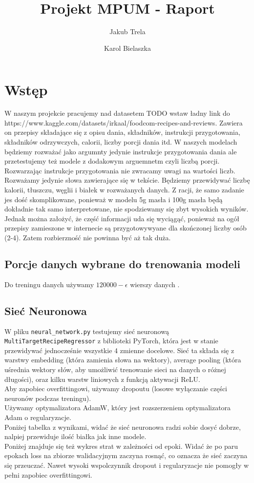 \documentclass[12pt,a4paper]{article}
\title{Projekt MPUM - Raport}
\author{Jakub Trela \and Karol Bielaszka}
\date{}
\begin{document}
\maketitle

\section*{Wstęp}
W naszym projekcie pracujemy nad datasetem {TODO wstaw ładny link do https://www.kaggle.com/datasets/irkaal/foodcom-recipes-and-reviews}. Zawiera on przepisy składające się z opisu dania, składników, instrukcji przygotowania, składników odrzywczych, calorii, liczby porcji dania itd. W naszych modelach będziemy rozważać jako argumnty jedynie instrukcje przygotowania dania ale przetestujemy też modele z dodakowym arguemnetm czyli liczbą porcji. Rozwarzając instrukcje przygotowania nie zwracamy uwagi na wartości liczb. Rozważamy jedynie słowa zawierające się w tekście. Będziemy przewidywać liczbę kalorii, tłuszczu, węglii i białek w rozważanych danych. Z racji, że samo zadanie jes dość skomplikowane, ponieważ w modelu 5g masła i 100g masła będą dokładnie tak samo interpretowane, nie spodziewamy się zbyt wysokich wyników. Jednak można założyć, że część informacji uda się wyciągąć, ponieważ na ogół przepisy zamieszone w internecie są przygotowywyane dla skończonej liczby osób (2-4). Zatem rozbierzność nie powinna być aż tak duża.

\subsection*{Porcje danych wybrane do trenowania modeli}
Do treningu danych używamy $120 000 - \epsilon$ wierszy danych .


\subsection*{Sieć Neuronowa}

W pliku \texttt{neural\_network.py} testujemy sieć neuronową \texttt{MultiTargetRecipeRegressor} z biblioteki PyTorch, która jest w stanie przewidywać jednocześnie wszystkie 4 zmienne docelowe. Sieć ta składa się z warstwy embedding (która zamienia słowa na wektory), average pooling (która uśrednia wektory słów, aby umożliwić trenowanie sieci na danych o różnej długości), oraz kilku warstw liniowych z funkcją aktywacji ReLU. \\
Aby zapobiec overfittingowi, używamy dropoutu (losowe wyłączanie części neuronów podczas treningu). \\
Używamy optymalizatora AdamW, który jest rozszerzeniem optymalizatora Adam o regularyzacje. \\ 
Poniżej tabelka z wynikami, widać że sieć neuronowa radzi sobie dosyć dobrze, nalpiej przewiduje ilość białka jak inne modele. \\
Poniżej znajduje się też wykres strat w zależności od epoki. Widać że po paru epokach loss na zbiorze walidacyjnym zaczyna rosnąć, co oznacza że sieć zaczyna się przeuczać. Nawet wysoki wspolczynnik dropout i regularyzacje nie pomogły w pełni zapobiec overfittingowi. \\
\end{document}
